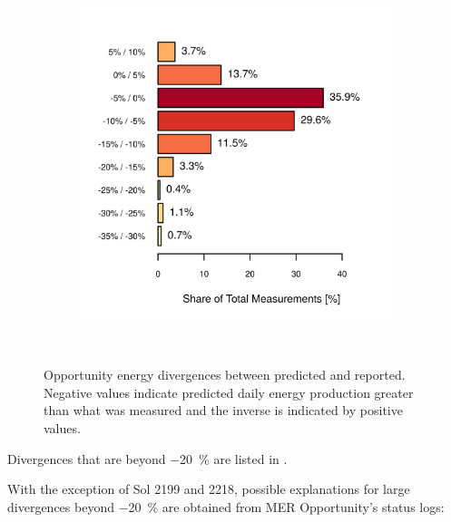 \begin{figure}[h]
\begin{subfigure}[t]{\subfigureWidth}
            \includegraphics[height=\graphicsHeight]{sections/mars-solar-energy/photovoltaic-energy/plots/binned-error-margins.png}
            \label{fig:plot:binned-error-margins}
    \end{subfigure}\\[0.8ex]
    \caption[Opportunity energy divergences between predicted and reported]
    {Opportunity energy divergences between predicted and reported. Negative values indicate predicted daily energy production greater than what was measured and the inverse is indicated by positive values.}
    \label{fig:plot:energy-divergence}
\vspace{-2ex}
\end{figure}

\vspace{0.5cm}

Divergences that are beyond \SI{-20}{\percent} are listed in .



\vspace{0.5cm}

With the exception of Sol 2199 and 2218, possible explanations for large divergences beyond \SI{-20}{\percent} are obtained from MER Opportunity's status logs:

